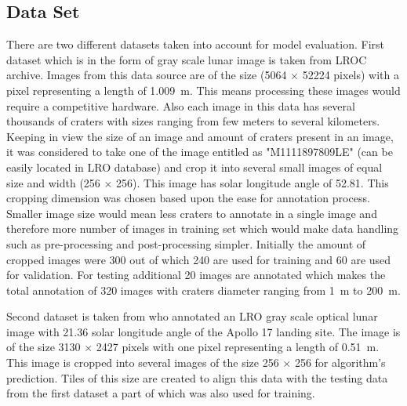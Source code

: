\documentclass[11pt]{article}
\begin{document}
\subsection{Data Set}
There are two different datasets taken into account for model evaluation. First dataset which is in the form of gray scale lunar image is taken from LROC archive. Images from this data source are of the size (5064 $\times$ 52224 pixels) with a pixel representing a length of \SI{1.009}{m}. This means processing these images would require a competitive hardware. Also each image in this data has several thousands of craters with sizes ranging from few meters to several kilometers. Keeping in view the size of an image and amount of craters present in an image, it was considered to take one of the image entitled as "M1111897809LE" (can be easily located in LRO database) and crop it into several small images of equal size and width (256 $\times$ 256). This image has solar longitude angle of 52.81\textdegree. This cropping dimension was chosen based upon the ease for annotation process. Smaller image size would mean less craters to annotate in a single image and therefore more number of images in training set which would make data handling such as pre-processing and post-processing simpler. Initially the amount of cropped images were 300 out of which 240 are used for training and 60 are used for validation. For testing additional 20 images are annotated which makes the total annotation of 320 images with craters diameter ranging from \SI{1}{m} to \SI{200}{m}. 

Second dataset is taken from \cite{dino2020} who annotated an LRO gray scale optical lunar image with 21.36\textdegree{} solar longitude angle of the Apollo 17 landing site. The image is of the size 3130 $\times$ 2427 pixels with one pixel representing a length of \SI{0.51}{m}. This image is cropped into several images of the size 256 $\times$ 256 for algorithm's prediction. Tiles of this size are created to align this data with the testing data from the first dataset a part of which was also used for training.

\end{document}
